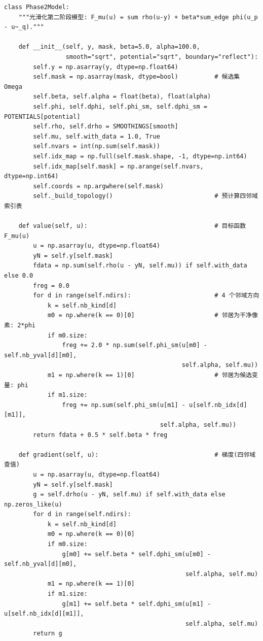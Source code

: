 \documentclass[withoutpreface,bwprint]{cumcmthesis}
\begin{document}
\begin{lstlisting}[style=appcode]
class Phase2Model:
    """光滑化第二阶段模型: F_mu(u) = sum rho(u-y) + beta*sum_edge phi(u_p - u~_q)."""

    def __init__(self, y, mask, beta=5.0, alpha=100.0,
                 smooth="sqrt", potential="sqrt", boundary="reflect"):
        self.y = np.asarray(y, dtype=np.float64)
        self.mask = np.asarray(mask, dtype=bool)          # 候选集 Omega
        self.beta, self.alpha = float(beta), float(alpha)
        self.phi, self.dphi, self.phi_sm, self.dphi_sm = POTENTIALS[potential]
        self.rho, self.drho = SMOOTHINGS[smooth]
        self.mu, self.with_data = 1.0, True
        self.nvars = int(np.sum(self.mask))
        self.idx_map = np.full(self.mask.shape, -1, dtype=np.int64)
        self.idx_map[self.mask] = np.arange(self.nvars, dtype=np.int64)
        self.coords = np.argwhere(self.mask)
        self._build_topology()                            # 预计算四邻域索引表

    def value(self, u):                                   # 目标函数 F_mu(u)
        u = np.asarray(u, dtype=np.float64)
        yN = self.y[self.mask]
        fdata = np.sum(self.rho(u - yN, self.mu)) if self.with_data else 0.0
        freg = 0.0
        for d in range(self.ndirs):                       # 4 个邻域方向
            k = self.nb_kind[d]
            m0 = np.where(k == 0)[0]                      # 邻居为干净像素: 2*phi
            if m0.size:
                freg += 2.0 * np.sum(self.phi_sm(u[m0] - self.nb_yval[d][m0],
                                                 self.alpha, self.mu))
            m1 = np.where(k == 1)[0]                      # 邻居为候选变量: phi
            if m1.size:
                freg += np.sum(self.phi_sm(u[m1] - u[self.nb_idx[d][m1]],
                                           self.alpha, self.mu))
        return fdata + 0.5 * self.beta * freg

    def gradient(self, u):                                # 梯度(四邻域查值)
        u = np.asarray(u, dtype=np.float64)
        yN = self.y[self.mask]
        g = self.drho(u - yN, self.mu) if self.with_data else np.zeros_like(u)
        for d in range(self.ndirs):
            k = self.nb_kind[d]
            m0 = np.where(k == 0)[0]
            if m0.size:
                g[m0] += self.beta * self.dphi_sm(u[m0] - self.nb_yval[d][m0],
                                                  self.alpha, self.mu)
            m1 = np.where(k == 1)[0]
            if m1.size:
                g[m1] += self.beta * self.dphi_sm(u[m1] - u[self.nb_idx[d][m1]],
                                                  self.alpha, self.mu)
        return g
\end{lstlisting}
\end{document}
